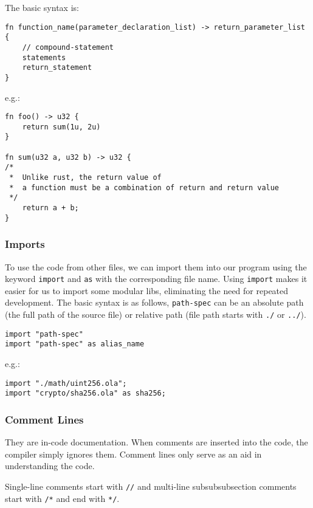 The basic syntax is:

\begin{lstlisting}
fn function_name(parameter_declaration_list) -> return_parameter_list {
    // compound-statement
    statements
    return_statement
}
\end{lstlisting}

e.g.:

\begin{lstlisting}
fn foo() -> u32 {
    return sum(1u, 2u)
}

fn sum(u32 a, u32 b) -> u32 {
/* 
 *  Unlike rust, the return value of 
 *  a function must be a combination of return and return value
 */
    return a + b;
}
\end{lstlisting}

\subsubsection{Imports}

To use the code from other files, we can import them into our program using the keyword \verb|import| and \verb|as| with the corresponding file name.
Using \verb|import| makes it easier for us to import some modular libs, eliminating the need for repeated development.
The basic syntax is as follows, \verb|path-spec| can be an absolute path (the full path of the source file) or relative path (file path starts with \verb|./| or \verb|../|).

\begin{lstlisting}
import "path-spec"
import "path-spec" as alias_name
\end{lstlisting}

e.g.:

\begin{lstlisting}
import "./math/uint256.ola";
import "crypto/sha256.ola" as sha256;
\end{lstlisting}

\subsubsection{Comment Lines}

They are in-code documentation. When comments are inserted into the code, the compiler simply ignores them. Comment lines only serve as an aid in understanding the code.

Single-line comments start with \texttt{//} and multi-line subsubsubsection comments start with \texttt{/*} and end with \texttt{*/}.

